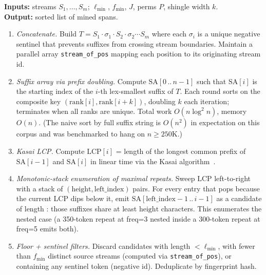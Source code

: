 \begin{algorithm}[h]
\small
\textbf{Inputs:} streams $S_1, \dots, S_m$;
                 $\ell_{\min}$, $f_{\min}$, $J$, perms $P$, shingle width $k$.\\
\textbf{Output:} sorted list of mined spans.

\begin{enumerate}
  \item[1.] \emph{Concatenate.} Build $T = S_1 \cdot \sigma_1 \cdot S_2 \cdot \sigma_2 \cdots S_m$
    where each $\sigma_i$ is a unique negative sentinel that prevents
    suffixes from crossing stream boundaries. Maintain a parallel
    array \texttt{stream\_of\_pos} mapping each position to its
    originating stream id.

  \item[2.] \emph{Suffix array via prefix doubling.} Compute
    $\mathrm{SA}[0\,..\,n{-}1]$ such that $\mathrm{SA}[i]$ is the
    starting index of the $i$-th lex-smallest suffix of $T$. Each
    round sorts on the composite key
    $(\mathrm{rank}[i], \mathrm{rank}[i{+}k])$, doubling $k$ each
    iteration; terminates when all ranks are unique. Total work
    $O(n \log^2 n)$, memory $O(n)$. (The naive sort by full suffix
    string is $O(n^2)$ in expectation on this corpus and was
    benchmarked to hang on $n {\geq} 250\mathrm{K}$.)

  \item[3.] \emph{Kasai LCP.} Compute $\mathrm{LCP}[i]$ = length of
    the longest common prefix of $\mathrm{SA}[i{-}1]$ and
    $\mathrm{SA}[i]$ in linear time via the Kasai
    algorithm~\cite{kasai-lcp}.

  \item[4.] \emph{Monotonic-stack enumeration of maximal repeats.}
    Sweep $\mathrm{LCP}$ left-to-right with a stack of
    $(\text{height}, \text{left\_index})$ pairs. For every entry that
    pops because the current LCP dips below it, emit
    $\mathrm{SA}[\text{left\_index}{-}1\,..\,i{-}1]$ as a candidate of
    length : those suffixes share at least
    $\text{height}$ characters. This enumerates the nested case
    (a 350-token repeat at freq=3 nested inside a 300-token repeat
    at freq=5 emits both).

  \item[5.] \emph{Floor + sentinel filters.} Discard candidates with
    length $< \ell_{\min}$, with fewer than $f_{\min}$ distinct
    source streams (computed via \texttt{stream\_of\_pos}), or
    containing any sentinel token (negative id). Deduplicate by
    fingerprint hash.


\end{enumerate}
\end{algorithm}
